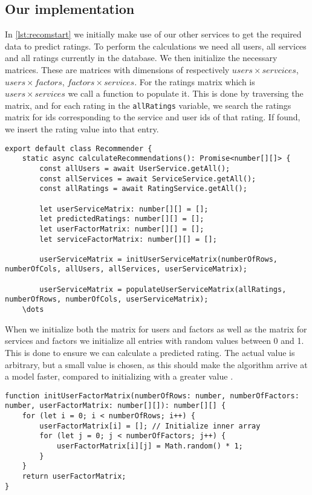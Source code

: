 \subsection{Our implementation}
In \autoref{lst:recomstart} we initially make use of our other services to get the required data to predict ratings.
To perform the calculations we need all users, all services and all ratings currently in the database.
We then initialize the necessary matrices.
These are matrices with dimensions of respectively $users \times servcices$, $users \times factors$, $factors \times services$. 
For the ratings matrix which is $users \times services$ we call a function to populate it.
This is done by traversing the matrix, and for each rating in the \texttt{allRatings} variable, we search the ratings matrix for ids corresponding to the service and user ids of that rating.
If found, we insert the rating value into that entry.
\begin{lstlisting}[caption={The start of the recommender}, captionpos=b, label={lst:recomstart}]
export default class Recommender {
    static async calculateRecommendations(): Promise<number[][]> {
        const allUsers = await UserService.getAll();
        const allServices = await ServiceService.getAll();
        const allRatings = await RatingService.getAll();
    
        let userServiceMatrix: number[][] = [];
        let predictedRatings: number[][] = [];
        let userFactorMatrix: number[][] = [];
        let serviceFactorMatrix: number[][] = [];

        userServiceMatrix = initUserServiceMatrix(numberOfRows, numberOfCols, allUsers, allServices, userServiceMatrix);

		userServiceMatrix = populateUserServiceMatrix(allRatings, numberOfRows, numberOfCols, userServiceMatrix);
    \dots
\end{lstlisting}
When we initialize both the matrix for users and factors as well as the matrix for services and factors we initialize all entries with random values between 0 and 1.
This is done to ensure we can calculate a predicted rating.
The actual value is arbitrary, but a small value is chosen, as this should make the algorithm arrive at a model faster, compared to initializing with a greater value \cite{FunkMatrixFactorization}.
\begin{lstlisting}[caption={Initializing the user and factor matrix}, captionpos=b, label={lst:initUserFactor}]
function initUserFactorMatrix(numberOfRows: number, numberOfFactors: number, userFactorMatrix: number[][]): number[][] {
    for (let i = 0; i < numberOfRows; i++) {
        userFactorMatrix[i] = []; // Initialize inner array
        for (let j = 0; j < numberOfFactors; j++) {
            userFactorMatrix[i][j] = Math.random() * 1;
        }
    }   
    return userFactorMatrix;
}
\end{lstlisting}
